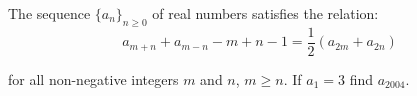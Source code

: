The sequence $\{a_n\}_{n\geq 0}$ of real numbers satisfies the relation:\[ a_{m+n} + a_{m-n} - m + n -1 = \frac12 (a_{2m} + a_{2n})  \]

for all non-negative integers $m$ and $n$,  $m \ge n$. If $a_1 = 3$ find $a_{2004}$.